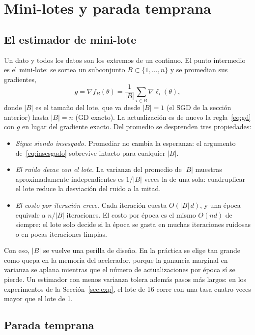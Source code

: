\section{Mini-lotes y parada temprana}\label{sec:minilotes}

\subsection{El estimador de mini-lote}

Un dato y todos los datos son los extremos de un continuo. El punto intermedio es el mini-lote: se sortea un subconjunto $B \subset \{1, \dots, n\}$ y se promedian sus gradientes,
\begin{equation}
  g = \nabla f_B(\theta) = \frac{1}{|B|}\sum_{i \in B} \nabla\ell_i(\theta),
  \label{eq:minibatch}
\end{equation}
donde $|B|$ es el tamaño del lote, que va desde $|B| = 1$ (el SGD de la sección anterior) hasta $|B| = n$ (GD exacto). La actualización es de nuevo la regla~\eqref{eq:gd} con $g$ en lugar del gradiente exacto. Del promedio se desprenden tres propiedades:
\begin{itemize}
  \item \emph{Sigue siendo insesgado.} Promediar no cambia la esperanza: el argumento de~\eqref{eq:insesgado} sobrevive intacto para cualquier $|B|$.
  \item \emph{El ruido decae con el lote.} La varianza del promedio de $|B|$ muestras aproximadamente independientes es $1/|B|$ veces la de una sola: cuadruplicar el lote reduce la desviación del ruido a la mitad.
  \item \emph{El costo por iteración crece.} Cada iteración cuesta $O(|B|\,d)$, y una época equivale a $n/|B|$ iteraciones. El costo por época es el mismo $O(nd)$ de siempre: el lote solo decide si la época se gasta en muchas iteraciones ruidosas o en pocas iteraciones limpias.
\end{itemize}

Con eso, $|B|$ se vuelve una perilla de diseño. En la práctica se elige tan grande como quepa en la memoria del acelerador, porque la ganancia marginal en varianza se aplana mientras que el número de actualizaciones por época sí se pierde. Un estimador con menos varianza tolera además pasos más largos: en los experimentos de la Sección~\ref{sec:exp}, el lote de 16 corre con una tasa cuatro veces mayor que el lote de 1.

\subsection{Parada temprana}

